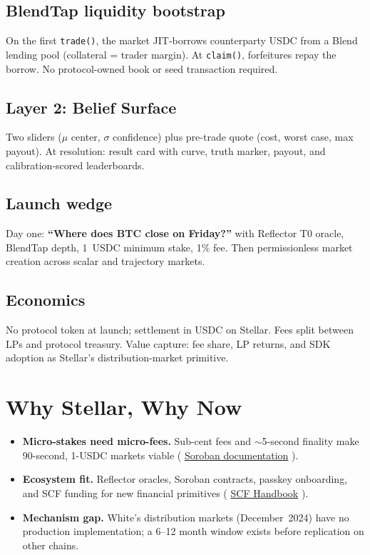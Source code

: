 \documentclass{portalciencia}
\newcommand{\linksoroban}{%
  \href{https://soroban.stellar.org}{Soroban documentation}%
}
\newcommand{\linkscf}{%
  \href{https://stellar.gitbook.io/scf-handbook}{SCF Handbook}%
}
\begin{document}
\subsection{BlendTap liquidity bootstrap}

On the first \texttt{trade()}, the market JIT-borrows counterparty USDC from a Blend lending pool (collateral = trader margin). At \texttt{claim()}, forfeitures repay the borrow. No protocol-owned book or seed transaction required.

\subsection{Layer 2: Belief Surface}

Two sliders ($\mu$ center, $\sigma$ confidence) plus pre-trade quote (cost, worst case, max payout). At resolution: result card with curve, truth marker, payout, and calibration-scored leaderboards.

\subsection{Launch wedge}

Day one: \textbf{``Where does BTC close on Friday?''} with Reflector T0 oracle, BlendTap depth, 1~USDC minimum stake, 1\% fee. Then permissionless market creation across scalar and trajectory markets.

\subsection{Economics}

No protocol token at launch; settlement in USDC on Stellar. Fees split between LPs and protocol treasury. Value capture: fee share, LP returns, and SDK adoption as Stellar's distribution-market primitive.

\section{Why Stellar, Why Now}

\begin{itemize}
  \item \textbf{Micro-stakes need micro-fees.} Sub-cent fees and $\sim$5-second finality make 90-second, 1-USDC markets viable (\linksoroban).
  \item \textbf{Ecosystem fit.} Reflector oracles, Soroban contracts, passkey onboarding, and SCF funding for new financial primitives (\linkscf).
  \item \textbf{Mechanism gap.} White's distribution markets (December~2024) have no production implementation; a 6--12 month window exists before replication on other chains.
\end{itemize}
\end{document}
